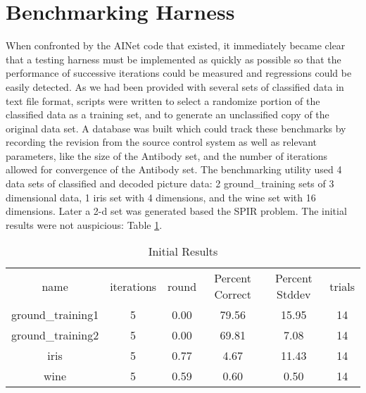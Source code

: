 \documentclass{article}
\theoremstyle{plain} %
\theoremstyle{remark}
\begin{document}
\section{Benchmarking Harness}
When confronted by the AINet code that existed, it immediately became
clear that a testing harness must be implemented as quickly as possible
so that the performance of successive iterations could be measured and
regressions could be easily detected. As we had been provided with
several sets of classified data in text file format, scripts were
written to select a randomize portion of the classified data as a
training set, and to generate an unclassified copy of the original data
set. A database was built which could track these benchmarks by
recording the revision from the source control system as well as
relevant parameters, like the size of the Antibody set, and the number
of iterations allowed for convergence of the Antibody set. The
benchmarking utility used 4 data sets of classified and decoded picture
data: 2 ground\_training sets of 3 dimensional data, 1 iris set with 4
dimensions, and the wine set with 16 dimensions. Later a 2-d set was
generated based the SPIR problem\cite{decastro}. The initial results
were not auspicious: Table \ref{initial_res}.

\begin{table}
\begin{tabular}{cccccc}
       name       & iterations & round & Percent Correct &
Percent Stddev & trials \\
 ground\_training1 & 5 &  0.00 & 79.56 & 15.95 &     14\\
 ground\_training2 & 5 &  0.00 & 69.81 & 7.08  &     14\\
 iris             & 5 &  0.77 &  4.67 & 11.43 &     14\\
 wine             & 5 &  0.59 &  0.60 & 0.50  &     14\\
\end{tabular}
\caption{Initial Results}
\label{initial_res}
\end{table}
\cite{bishop}

\pagebreak


\end{document}
